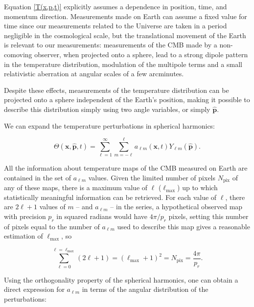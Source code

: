 \documentclass[openany,a4paper,12pt,oneside]{book}
\begin{document}
\begin{spacing}{1.5}
Equation \eqref{T(x,p,t)} explicitly assumes a dependence in position, time, and momentum direction. Measurements made on Earth can assume a fixed value for time since our measurements related to the Universe are taken in a period negligible in the cosmological scale, but the translational movement of the Earth is relevant to our measurements: measurements of the CMB made by a non-comoving observer, when projected onto a sphere, lead to a strong dipole pattern in the temperature distribution, modulation of the multipole terms and a small relativistic aberration at angular scales of a few arcminutes\cite{COBE_calibration, Planck_doppler, esteban_msc}.

Despite these effects, measurements of the temperature distribution can be projected onto a sphere independent of the Earth's position, making it possible to describe this distribution simply using two angle variables, or simply $\hat{\mathbf{p}}$.

We can expand the temperature perturbations in spherical harmonics:

\begin{equation}\label{ch2:Theta_spherical harmonics}
    \Theta(\mathbf{x}, \hat{\mathbf{p}}, t)=\sum_{\ell=1}^\infty \sum_{m=-\ell}^\ell a_{\ell m}(\mathbf{x}, t)Y_{\ell m}(\hat{\mathbf{p}}).
\end{equation}

All the information about temperature maps of the CMB measured on Earth are contained in the set of $a_{\ell m}$ values. Given the limited number of pixels $N_\text{pix}$ of any of these maps, there is a maximum value of $\ell$ ($\ell_\text{max}$) up to which statistically meaningful information can be retrieved. For each value of $\ell$, there are $2\ell+1$ values of $m$ -- and $a_{\ell m}$ -- in the series, a hypothetical observed map with precision $p_r$ in squared radians would have $4\pi/p_r$ pixels, setting this number of pixels equal to the number of $a_{\ell m}$ used to describe this map gives a reasonable estimation of $\ell_\text{max}$\cite{dodelson2020modern}, so %

\begin{equation}\label{Npix}
    \sum_{\ell=0}^{\ell=\ell_\text{max}}(2\ell+1)=(\ell_\text{max}+1)^2=N_\text{pix}=\frac{4\pi}{p_r}.
\end{equation}

Using the orthogonality property of the spherical harmonics, one can obtain a direct expression for $a_{\ell m}$ in terms of the angular distribution of the perturbations:


\end{spacing}
\end{document}
